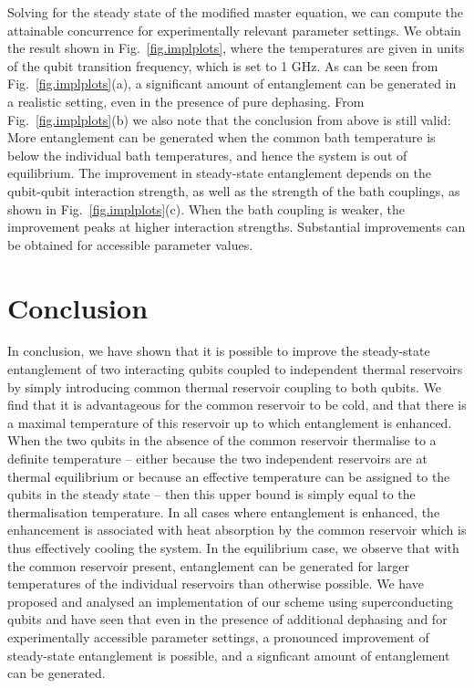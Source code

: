 \documentclass[12pt]{iopart}
\begin{document}
Solving for the steady state of the modified master equation, we can compute the attainable concurrence for experimentally relevant parameter settings. We obtain the result shown in Fig.~\ref{fig.implplots}, where the temperatures are given in units of the qubit transition frequency, which is set to 1 GHz. As can be seen from Fig.~\ref{fig.implplots}(a), a significant amount of entanglement can be generated in a realistic setting, even in the presence of pure dephasing. From Fig.~\ref{fig.implplots}(b) we also note that the conclusion from above is still valid: More entanglement can be generated when the common bath temperature is below the individual bath temperatures, and hence the system is out of equilibrium. The improvement in steady-state entanglement depends on the qubit-qubit interaction strength, as well as the strength of the bath couplings, as shown in Fig.~\ref{fig.implplots}(c). When the bath coupling is weaker, the improvement peaks at higher interaction strengths. Substantial improvements can be obtained for accessible parameter values.








\section{Conclusion}

In conclusion, we have shown that it is possible to improve the steady-state entanglement of two interacting qubits coupled to independent thermal reservoirs by simply introducing common thermal reservoir coupling to both qubits. We find that it is advantageous for the common reservoir to be cold, and that there is a maximal temperature of this reservoir up to which entanglement is enhanced. When the two qubits in the absence of the common reservoir thermalise to a definite temperature -- either because the two independent reservoirs are at thermal equilibrium or because an effective temperature can be assigned to the qubits in the steady state -- then this upper bound is simply equal to the thermalisation temperature. In all cases where entanglement is enhanced, the enhancement is associated with heat absorption by the common reservoir which is thus effectively cooling the system. In the equilibrium case, we observe that with the common reservoir present, entanglement can be generated for larger temperatures of the individual reservoirs than otherwise possible. We have proposed and analysed an implementation of our scheme using superconducting qubits and have seen that even in the presence of additional dephasing and for experimentally accessible parameter settings, a pronounced improvement of steady-state entanglement is possible, and a signficant amount of entanglement can be generated.
\end{document}
